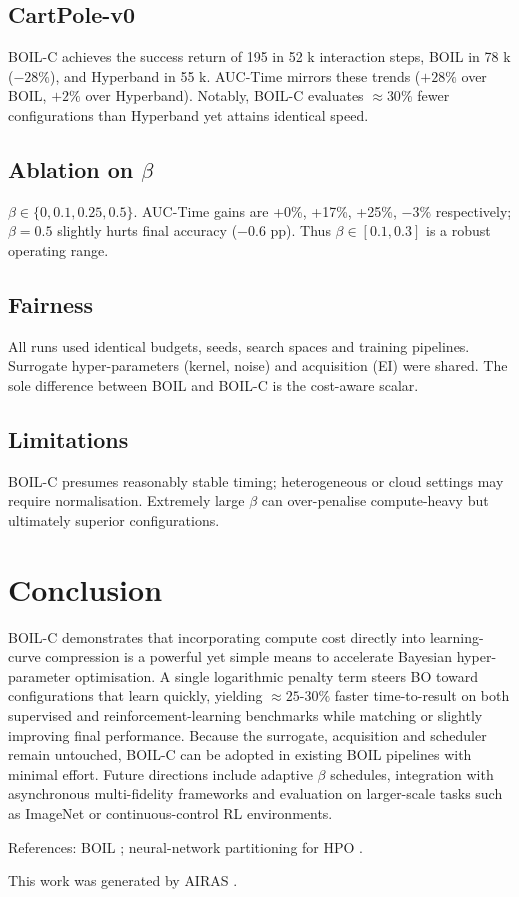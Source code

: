 \documentclass{article} %
\begin{document}
\subsection{CartPole-v0}
BOIL-C achieves the success return of 195 in 52 k interaction steps, BOIL in 78 k (\(-28\%\)), and Hyperband in 55 k. AUC-Time mirrors these trends (\(+28\%\) over BOIL, \(+2\%\) over Hyperband). Notably, BOIL-C evaluates \(\approx 30\%\) fewer configurations than Hyperband yet attains identical speed.

\subsection{Ablation on \(\beta\)}
\(\beta\in\{0,0.1,0.25,0.5\}\). AUC-Time gains are +0\%, +17\%, +25\%, \(-3\%\) respectively; \(\beta=0.5\) slightly hurts final accuracy (\(-0.6\) pp). Thus \(\beta\in[0.1,0.3]\) is a robust operating range.

\subsection{Fairness}
All runs used identical budgets, seeds, search spaces and training pipelines. Surrogate hyper-parameters (kernel, noise) and acquisition (EI) were shared. The sole difference between BOIL and BOIL-C is the cost-aware scalar.

\subsection{Limitations}
BOIL-C presumes reasonably stable timing; heterogeneous or cloud settings may require normalisation. Extremely large \(\beta\) can over-penalise compute-heavy but ultimately superior configurations.

\section{Conclusion}
\label{sec:conclusion}
BOIL-C demonstrates that incorporating compute cost directly into learning-curve compression is a powerful yet simple means to accelerate Bayesian hyper-parameter optimisation. A single logarithmic penalty term steers BO toward configurations that learn quickly, yielding \(\approx 25\text{-}30\%\) faster time-to-result on both supervised and reinforcement-learning benchmarks while matching or slightly improving final performance. Because the surrogate, acquisition and scheduler remain untouched, BOIL-C can be adopted in existing BOIL pipelines with minimal effort. Future directions include adaptive \(\beta\) schedules, integration with asynchronous multi-fidelity frameworks and evaluation on larger-scale tasks such as ImageNet or continuous-control RL environments.

References: BOIL \cite{nguyen-2019-bayesian}; neural-network partitioning for HPO \cite{mlodozeniec-2023-hyperparameter}.

This work was generated by \textsc{AIRAS} \citep{airas2025}.



\end{document}
